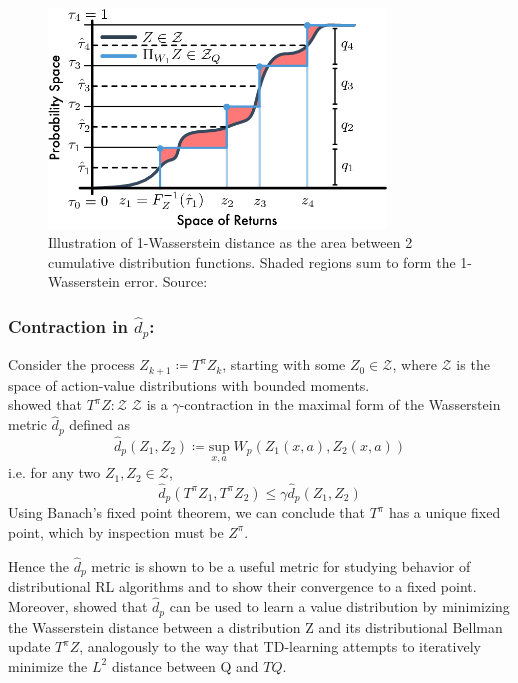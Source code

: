 \begin{figure}[ht]
    \centering
    \includegraphics[width=0.8\textwidth]{images/wasserstein.png}
    \caption{Illustration of 1-Wasserstein distance as the area between 2 cumulative distribution
    functions. Shaded regions sum to form the 1-Wasserstein error. Source: \citet{Dabney2018a}}
    \label{fig:wasserstein}

\end{figure}

\subsubsection{Contraction in $\hat{d}_p$:}
Consider the process $Z_{k+1} \coloneqq T^\pi Z_{k}$, starting with some $Z_{0} \in \mathcal{Z}$, 
where $\mathcal{Z}$  is the space of action-value distributions with bounded moments.\\
\cite{Bellemare2017} showed that
$T^\pi Z: \mathcal{Z}$  \ra $\mathcal{Z}$ is a $\gamma$-contraction in the maximal form of the Wasserstein
metric $\hat{d}_p$ defined as
\begin{equation}
    \hat{d}_p(Z_1,Z_2) \coloneqq \underset{x,a} {\text{sup}}  \;W_p(Z_1(x,a),Z_2(x,a))
\end{equation}
i.e. for any two $Z_1, Z_2 \in \mathcal{Z}$,
\begin{equation}
    \hat{d}_p(T^\pi Z_1, T^\pi Z_2) \leq \gamma \hat{d}_p(Z_1,Z_2)
\end{equation}
Using Banach's fixed point theorem, we can conclude that $T^\pi$ has a unique fixed point,
which by inspection must be $Z^\pi$.

Hence the $\hat{d}_p$ metric is shown to be a useful metric for studying behavior of
distributional RL algorithms and to show their convergence to a fixed point.\\
Moreover,  \cite{Bellemare2017} showed that $\hat{d}_p$ can be used to learn a value distribution
by minimizing the Wasserstein distance between a distribution Z and its distributional Bellman update
$T^\pi Z$, analogously to the way that TD-learning attempts to iteratively minimize
the $L^2$ distance between Q and $TQ$.

